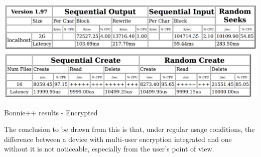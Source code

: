 \begin{table}[ht]
\centering
    \includegraphics[width=\textwidth]{src/img/perf/results2.pdf}
\caption{Bonnie++ results - Encrypted}
\label{tbl:res-enc-eval}
\end{table}

The conclusion to be drawn from this is that, under regular usage conditions, the difference between a device with multi-user encryption integrated and one without it is not noticeable, especially from the user's point of view.

